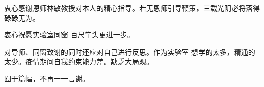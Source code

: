 \begin{acknowledgement}
    衷心感谢恩师林敏教授对本人的精心指导。若无恩师引导鞭策，三载光阴必将落得碌碌无为。

    衷心祝愿实验室同窗 百尺竿头更进一步。

    对导师、同窗致谢的同时还应对自己进行反思。作为实验室 想学的太多，精通的太少。疫情期间自我约束能力差。缺乏大局观。

    囿于篇幅，不再一一言谢。
\end{acknowledgement}
